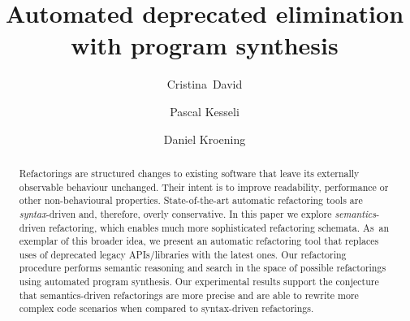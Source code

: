 \documentclass[runningheads,a4paper]{llncs}
\begin{document}




\title{Automated deprecated elimination with program synthesis}

\author{
\mbox{Cristina David} \and
Pascal Kesseli \and
Daniel Kroening}





\maketitle

\begin{abstract}
%
  Refactorings are structured changes to existing software that leave its
  externally observable behaviour unchanged.  Their intent is to improve
  readability, performance or other non-behavioural properties. 
  State-of-the-art automatic refactoring tools are {\em syntax}-driven and,
  therefore, overly conservative.  In this paper we explore {\em
  semantics}-driven refactoring, which enables much more sophisticated
  refactoring schemata.  As~an exemplar of this broader idea, we present
  an automatic refactoring tool that replaces uses of deprecated legacy APIs/libraries
  with the latest ones.
  Our refactoring procedure performs
  semantic reasoning and search in the space of possible refactorings using
  automated program synthesis.  Our experimental results support the
  conjecture that semantics-driven refactorings are more precise and are
  able to rewrite more complex code scenarios when compared to syntax-driven
  refactorings.
%
\end{abstract}
\end{document}
